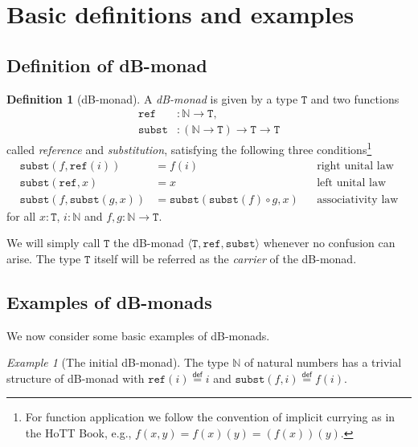 \documentclass[a4paper,twoside,12pt]{article}
\theoremstyle{definition}
\newtheorem{definition}{Definition}
\theoremstyle{remark}
\theoremstyle{example}
\newtheorem{example}{Example}
\newcommand{\NN}{\mathbb{N}}
\newcommand{\TT}{\mathtt{T}}
\newcommand{\subst}{\mathtt{subst}}
\newcommand{\refe}{\mathtt{ref}}
\begin{document}
\section{Basic definitions and examples}
\label{sec:basic-def}

\subsection{Definition of dB-monad}
\label{sec:basic-defin-example}

\begin{definition}[dB-monad]
  A \emph{dB-monad} is given by a type $\TT$ and two functions
  \begin{align*}
    \refe &\colon \NN \to \TT, \\
    \subst &\colon (\NN \to \TT) \to \TT \to \TT
  \end{align*}
  called \emph{reference} and \emph{substitution}, satisfying the
  following three conditions\footnote{For function application we
    follow the convention of implicit currying as in the HoTT Book,
    e.g., $f(x,y) = f(x)(y) = (f(x))(y)$.}
  \begin{align*}
    \subst(f,\refe(i)) &=  f(i)
    && \text{right unital law} \\
    \subst(\refe, x) &=  x
    && \text{left unital law} \\
    \subst(f, \subst(g, x)) &= \subst(\subst(f) \circ g, x)
    &&\text{associativity law}
  \end{align*}
  for all $x : \TT$, $i :\NN$ and $f,g\colon \NN \to \TT$.
\end{definition}

We will simply call $\TT$ the dB-monad
$\langle \TT, \refe, \subst \rangle$ whenever no confusion can arise.
The type $\TT$ itself will be referred as the \emph{carrier} of the
dB-monad.

\subsection{Examples of dB-monads}
\label{sec:examples-dB-monads}

We now consider some basic examples of dB-monads.

\begin{example}[The initial dB-monad]
  The type $\NN$ of natural numbers has a trivial structure of
  dB-monad with $\refe(i) \stackrel{\mathsf{def}}{=} i$ and
  $\subst(f,i) \stackrel{\mathsf{def}}{=} f(i)$.
\end{example}
\end{document}
